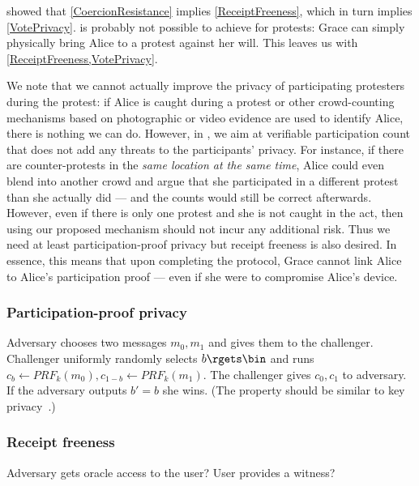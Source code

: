  showed that \cref{CoercionResistance} implies \cref{ReceiptFreeness}, which in turn implies \cref{VotePrivacy}. 
 is probably not possible to achieve for protests:
\eg Grace can simply physically bring Alice to a protest against her will.
This leaves us with \cref{ReceiptFreeness,VotePrivacy}.

We note that we cannot actually improve the privacy of participating protesters during the protest: if Alice is caught during a protest or other crowd-counting mechanisms based on photographic or video evidence are used to identify Alice, there is nothing we can do. 
However, in \PRIVO, we aim at verifiable participation count that does not add any threats to the participants' privacy. 
For instance, if there are counter-protests in the \emph{same location at the same time}, Alice could even blend into another crowd and argue that she participated in a different protest than she actually did --- and the counts would still be correct afterwards.
However, even if there is only one protest and she is not caught in the act, then using our proposed mechanism should not incur any additional risk.
Thus we need at least participation-proof privacy but receipt freeness is also desired.
In essence, this means that upon completing the protocol, Grace cannot link Alice to Alice's participation proof --- even if she were to compromise Alice's device.

\subsubsection{Participation-proof privacy}

\begin{definition}
  Adversary chooses two messages \(m_0, m_1\) and gives them to the challenger.
  Challenger uniformly randomly selects \(b\rgets \bin\) and runs \(c_b \gets 
    PRF_k(m_0), c_{1-b} \gets PRF_k(m_1)\).
  The challenger gives \(c_0, c_1\) to adversary.
  If the adversary outputs \(b' = b\) she wins.
  (The property should be similar to key privacy~\cite{KeyPrivacy}.)
\end{definition}

\subsubsection{Receipt freeness}

\begin{definition}
  Adversary gets oracle access to the user?
  User provides a witness?
\end{definition}

